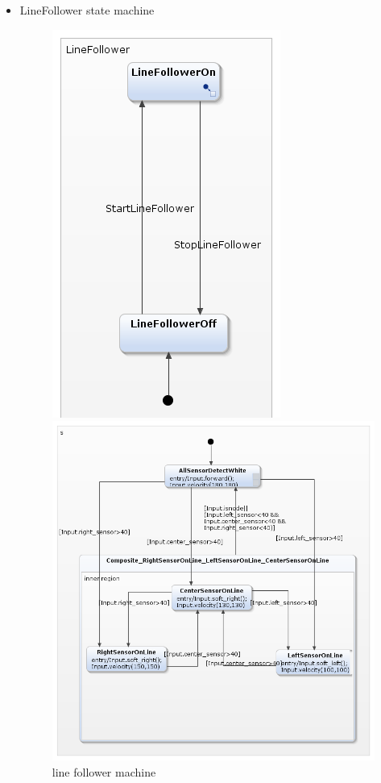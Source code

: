 \documentclass[a4paper,12pt,oneside]{book}
\begin{document}
\begin{itemize}
\item LineFollower state machine

\begin{figure}[!htbp]
	\begin{minipage}{0.45\textwidth}
	\centering
	\includegraphics[scale=.7]{linefollower.png}
	\caption{line follower machine}
	\label{linefollower}
\end{minipage}
	\begin{minipage}{0.45\textwidth}
	\centering
	\includegraphics[scale=.6]{linefollower_on.png}

\end{minipage}
\end{figure}
\end{itemize}
\end{document}
